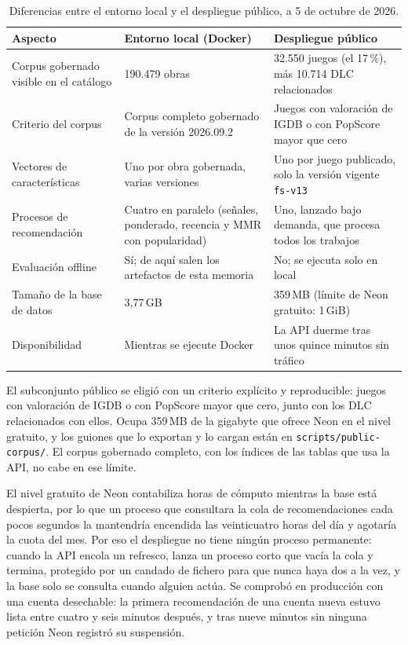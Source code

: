 \begin{table}[H]
\centering
\begin{tabularx}{\textwidth}{ | L{0.26\textwidth} | Y | Y | }
    \hline
    \textbf{Aspecto} & \textbf{Entorno local (Docker)} & \textbf{Despliegue público} \\
    \hline
    Corpus gobernado visible en el catálogo & 190.479 obras & 32.550 juegos (el 17\,\%), más 10.714 DLC relacionados \\
    \hline
    Criterio del corpus & Corpus completo gobernado de la versión 2026.09.2 & Juegos con valoración de IGDB o con PopScore mayor que cero \\
    \hline
    Vectores de características & Uno por obra gobernada, varias versiones & Uno por juego publicado, solo la versión vigente \texttt{fs-v13} \\
    \hline
    Procesos de recomendación & Cuatro en paralelo (señales, ponderado, recencia y MMR con popularidad) & Uno, lanzado bajo demanda, que procesa todos los trabajos \\
    \hline
    Evaluación offline & Sí; de aquí salen los artefactos de esta memoria & No; se ejecuta solo en local \\
    \hline
    Tamaño de la base de datos & 3,77\,GB & 359\,MB (límite de Neon gratuito: 1\,GiB) \\
    \hline
    Disponibilidad & Mientras se ejecute Docker & La API duerme tras unos quince minutos sin tráfico \\
    \hline
\end{tabularx}
\caption{Diferencias entre el entorno local y el despliegue público, a 5 de octubre de 2026.}
\label{tab:local-publico}
\end{table}

El subconjunto público se eligió con un criterio explícito y reproducible: juegos con valoración de IGDB o con PopScore
mayor que cero, junto con los DLC relacionados con ellos. Ocupa 359\,MB de la gigabyte que ofrece Neon en el nivel
gratuito, y los guiones que lo exportan y lo cargan están en \texttt{scripts/public-corpus/}. El corpus gobernado completo,
con los índices de las tablas que usa la API, no cabe en ese límite.

El nivel gratuito de Neon contabiliza horas de cómputo mientras la base está despierta, por lo que un proceso que
consultara la cola de recomendaciones cada pocos segundos la mantendría encendida las veinticuatro horas del día y
agotaría la cuota del mes. Por eso el despliegue no tiene ningún proceso permanente: cuando la API encola un refresco,
lanza un proceso corto que vacía la cola y termina, protegido por un candado de fichero para que nunca haya dos a la vez,
y la base solo se consulta cuando alguien actúa. Se comprobó en producción con una cuenta desechable: la primera
recomendación de una cuenta nueva estuvo lista entre cuatro y seis minutos después, y tras nueve minutos sin ninguna
petición Neon registró su suspensión.

